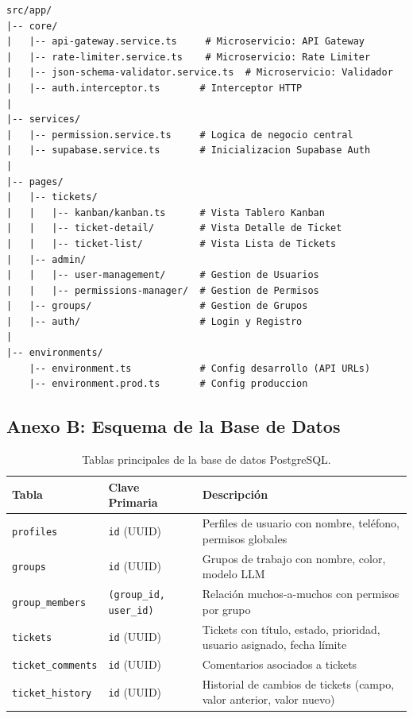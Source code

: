 \documentclass[12pt,a4paper]{article}
\begin{document}
\begin{lstlisting}[caption={Estructura de directorios del proyecto ERP.}, label={lst:estructura}]
src/app/
|-- core/
|   |-- api-gateway.service.ts     # Microservicio: API Gateway
|   |-- rate-limiter.service.ts    # Microservicio: Rate Limiter
|   |-- json-schema-validator.service.ts  # Microservicio: Validador
|   |-- auth.interceptor.ts       # Interceptor HTTP
|
|-- services/
|   |-- permission.service.ts     # Logica de negocio central
|   |-- supabase.service.ts       # Inicializacion Supabase Auth
|
|-- pages/
|   |-- tickets/
|   |   |-- kanban/kanban.ts      # Vista Tablero Kanban
|   |   |-- ticket-detail/        # Vista Detalle de Ticket
|   |   |-- ticket-list/          # Vista Lista de Tickets
|   |-- admin/
|   |   |-- user-management/      # Gestion de Usuarios
|   |   |-- permissions-manager/  # Gestion de Permisos
|   |-- groups/                   # Gestion de Grupos
|   |-- auth/                     # Login y Registro
|
|-- environments/
    |-- environment.ts            # Config desarrollo (API URLs)
    |-- environment.prod.ts       # Config produccion
\end{lstlisting}

\subsection{Anexo B: Esquema de la Base de Datos}

\begin{table}[H]
    \centering
    \caption{Tablas principales de la base de datos PostgreSQL.}
    \label{tab:db-schema}
    \begin{tabular}{@{}llp{7cm}@{}}
        \toprule
        \textbf{Tabla} & \textbf{Clave Primaria} & \textbf{Descripción} \\
        \midrule
        \texttt{profiles} & \texttt{id} (UUID) & Perfiles de usuario con nombre, teléfono, permisos globales \\
        \texttt{groups} & \texttt{id} (UUID) & Grupos de trabajo con nombre, color, modelo LLM \\
        \texttt{group\_members} & \texttt{(group\_id, user\_id)} & Relación muchos-a-muchos con permisos por grupo \\
        \texttt{tickets} & \texttt{id} (UUID) & Tickets con título, estado, prioridad, usuario asignado, fecha límite \\
        \texttt{ticket\_comments} & \texttt{id} (UUID) & Comentarios asociados a tickets \\
        \texttt{ticket\_history} & \texttt{id} (UUID) & Historial de cambios de tickets (campo, valor anterior, valor nuevo) \\
        \bottomrule
    \end{tabular}
\end{table}
\end{document}

